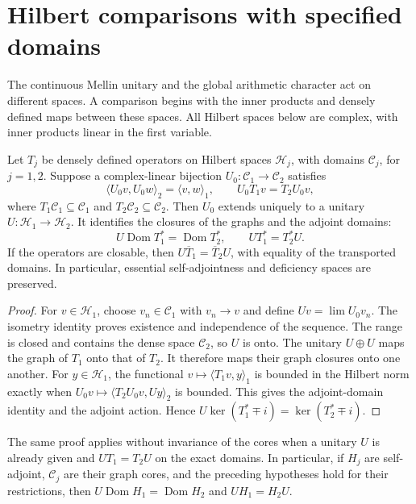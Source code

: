 \section{Hilbert comparisons with specified domains}
\label{v4-arith:mc:comparisons}

The continuous Mellin unitary and the global arithmetic character
act on different spaces. A comparison begins with the inner products
and densely defined maps between these spaces. All Hilbert spaces
below are complex, with inner products linear in the first variable.

\begin{proposition}
\label{v4-arith:mc:core-unitary}
Let $T_j$ be densely defined operators on Hilbert spaces
$\mathcal H_j$, with domains $\mathcal C_j$, for $j=1,2$.
Suppose a complex-linear bijection $U_0:\mathcal C_1\to\mathcal C_2$
satisfies
\[
 \langle U_0v,U_0w\rangle_2=\langle v,w\rangle_1,
 \qquad U_0T_1v=T_2U_0v,
\]
where $T_1\mathcal C_1\subseteq\mathcal C_1$ and
$T_2\mathcal C_2\subseteq\mathcal C_2$.
Then $U_0$ extends uniquely to a unitary $U:\mathcal H_1\to\mathcal H_2$.
It identifies the closures of the graphs and the adjoint domains:
\[
 U\operatorname{Dom}T_1^*=\operatorname{Dom}T_2^*,\qquad
 UT_1^*=T_2^*U.
\]
If the operators are closable, then
$U\overline T_1=\overline T_2U$, with equality of the transported
domains. In particular, essential self-adjointness and deficiency
spaces are preserved.
\end{proposition}
\begin{proof}
For $v\in\mathcal H_1$, choose $v_n\in\mathcal C_1$ with $v_n\to v$
and define $Uv=\lim U_0v_n$. The isometry identity proves existence
and independence of the sequence. The range is closed and contains
the dense space $\mathcal C_2$, so $U$ is onto.
The unitary $U\oplus U$ maps the graph of $T_1$ onto that of $T_2$.
It therefore maps their graph closures onto one another.
For $y\in\mathcal H_1$, the functional
$v\mapsto\langle T_1v,y\rangle_1$ is bounded in the Hilbert norm
exactly when $U_0v\mapsto\langle T_2U_0v,Uy\rangle_2$ is bounded.
This gives the adjoint-domain identity and the adjoint action.
Hence $U\ker(T_1^*\mp i)=\ker(T_2^*\mp i)$.
\end{proof}

The same proof applies without invariance of the cores when a
unitary $U$ is already given and $UT_1=T_2U$ on the exact domains.
In particular, if $H_j$ are self-adjoint, $\mathcal C_j$ are their
graph cores, and the preceding hypotheses hold for their restrictions,
then $U\operatorname{Dom}H_1=\operatorname{Dom}H_2$ and $UH_1=H_2U$.

